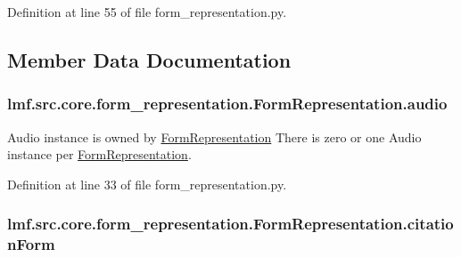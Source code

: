 Definition at line 55 of file form\+\_\+representation.\+py.



\subsection{Member Data Documentation}
\hypertarget{classlmf_1_1src_1_1core_1_1form__representation_1_1_form_representation_ac13f0605619b9bdc6b921ae19b39c068}{
\subsubsection[{audio}]{\setlength{\rightskip}{0pt plus 5cm}lmf.\+src.\+core.\+form\+\_\+representation.\+Form\+Representation.\+audio}}\label{classlmf_1_1src_1_1core_1_1form__representation_1_1_form_representation_ac13f0605619b9bdc6b921ae19b39c068}


Audio instance is owned by \hyperlink{classlmf_1_1src_1_1core_1_1form__representation_1_1_form_representation}{Form\+Representation} There is zero or one Audio instance per \hyperlink{classlmf_1_1src_1_1core_1_1form__representation_1_1_form_representation}{Form\+Representation}. 



Definition at line 33 of file form\+\_\+representation.\+py.

\hypertarget{classlmf_1_1src_1_1core_1_1form__representation_1_1_form_representation_a70151ff258dea274006e4976818847a3}{
\subsubsection[{citation\+Form}]{\setlength{\rightskip}{0pt plus 5cm}lmf.\+src.\+core.\+form\+\_\+representation.\+Form\+Representation.\+citation\+Form}}\label{classlmf_1_1src_1_1core_1_1form__representation_1_1_form_representation_a70151ff258dea274006e4976818847a3}


